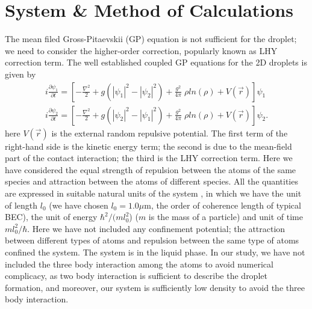 \documentclass[amsmath,amssymb,lengthcheck,aps,prl] {revtex4}
\begin{document}


\section{System \& Method of Calculations}
	 The mean filed Gross-Pitaevskii (GP) equation is not sufficient for the droplet; we need to consider the higher-order correction, popularly known as LHY \cite{LHY} correction term.
The well established coupled GP equations for the 2D droplets is given by \cite{2D_liquid}
\small{
\begin{eqnarray}
   i\frac{\partial\psi_1 }{\partial t}=\left[-\frac{\nabla ^2}{2} + g(|\psi_1|^2 - |\psi_2|^2) + \frac{g^2}{4\pi} \; \rho ln(\rho) + V(\vec{r}) \right ]\psi_1 \nonumber \\
      i\frac{\partial\psi_2 }{\partial t}=\left[-\frac{\nabla ^2}{2} + g(|\psi_2|^2 - |\psi_1|^2) + \frac{g^2}{4\pi} \; \rho ln(\rho) + V(\vec{r}) \right ]\psi_2.
\end{eqnarray}
}
\normalsize
here $V(\vec{r})$ is the external random repulsive potential.
The first term of the right-hand side is the kinetic energy term; the second is due to the mean-field part of the contact interaction; the third is the LHY correction term. Here we have considered the equal strength of repulsion between the atoms of the same species and attraction between the atoms of different species. All the quantities are expressed in suitable natural units of
the system \cite{dimension}, in which we have the unit of length $l_0$ (we have chosen $l_0=1.0\mu $m, the order of coherence length of typical BEC), the unit of energy $\hbar^2 /(m l_0^2$) ($m$ is the mass of a particle) and unit of time $ml_0^2/\hbar$.
Here we have not included any confinement potential; the attraction between different types of atoms and repulsion between the same type of atoms confined the system. The system is in the liquid phase. In our study, we have not included the three body interaction among the atoms\cite{dimension, 3body2} to avoid numerical complicacy, as two body interaction is sufficient to describe the droplet formation, and moreover, our system is sufficiently low density to avoid the three body interaction.
\end{document}
